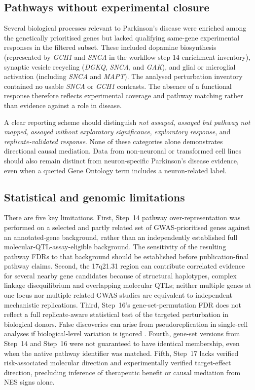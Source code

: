 \documentclass[11pt,a4paper]{article}
\begin{document}
\subsection{Pathways without experimental closure}
\label{subsec:discussion_gaps}
Several biological processes relevant to Parkinson's disease were enriched among the genetically prioritised genes but lacked qualifying same-gene experimental responses in the filtered subset. These included dopamine biosynthesis (represented by \textit{GCH1} and \textit{SNCA} in the workflow-step-14 enrichment inventory), synaptic vesicle recycling (\textit{DGKQ}, \textit{SNCA}, and \textit{GAK}), and glial or microglial activation (including \textit{SNCA} and \textit{MAPT}). The analysed perturbation inventory contained no usable \textit{SNCA} or \textit{GCH1} contrasts. The absence of a functional response therefore reflects experimental coverage and pathway matching rather than evidence against a role in disease.

A clear reporting scheme should distinguish \emph{not assayed}, \emph{assayed but pathway not mapped}, \emph{assayed without exploratory significance}, \emph{exploratory response}, and \emph{replicate-validated response}. None of these categories alone demonstrates directional causal mediation. Data from non-neuronal or transformed cell lines should also remain distinct from neuron-specific Parkinson's disease evidence, even when a queried Gene Ontology term includes a neuron-related label.

\subsection{Statistical and genomic limitations}
\label{subsec:discussion_limits}
There are five key limitations. First, Step~14 pathway over-representation was performed on a selected and partly related set of GWAS-prioritised genes against an annotated-gene background, rather than an independently established full molecular-QTL-assay-eligible background. The sensitivity of the resulting pathway FDRs to that background should be established before publication-final pathway claims. Second, the 17q21.31 region can contribute correlated evidence for several nearby gene candidates because of structural haplotypes, complex linkage disequilibrium and overlapping molecular QTLs; neither multiple genes at one locus nor multiple related GWAS studies are equivalent to independent mechanistic replications. Third, Step~16's gene-set-permutation FDR does not reflect a full replicate-aware statistical test of the targeted perturbation in biological donors. False discoveries can arise from pseudoreplication in single-cell analyses if biological-level variation is ignored \cite{Squair2021FalseDiscoveries}. Fourth, gene-set versions from Step~14 and Step~16 were not guaranteed to have identical membership, even when the native pathway identifier was matched. Fifth, Step~17 lacks verified risk-associated molecular direction and experimentally verified target-effect direction, precluding inference of therapeutic benefit or causal mediation from NES signs alone.
\end{document}

